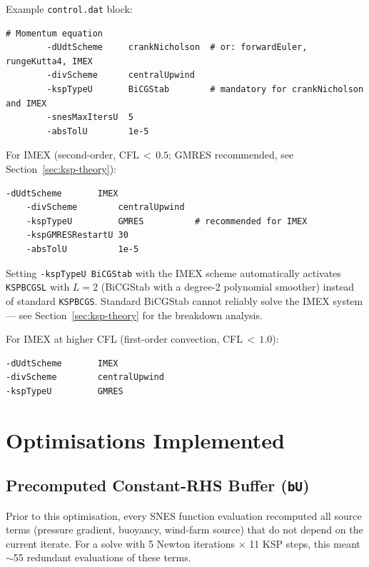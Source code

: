 \documentclass[12pt,a4paper]{article}
\begin{document}
	Example \texttt{control.dat} block:
	
	\begin{lstlisting}[language={},style=cstyle]
		# Momentum equation
		-dUdtScheme     crankNicholson  # or: forwardEuler, rungeKutta4, IMEX
		-divScheme      centralUpwind
		-kspTypeU       BiCGStab        # mandatory for crankNicholson and IMEX
		-snesMaxItersU  5
		-absTolU        1e-5
	\end{lstlisting}
	
	For IMEX (second-order, CFL$\,{<}\,0.5$; GMRES recommended,
	see Section~\ref{sec:ksp-theory}):
	\begin{lstlisting}[language={},style=cstyle]
	-dUdtScheme       IMEX
	-divScheme        centralUpwind
	-kspTypeU         GMRES          # recommended for IMEX
	-kspGMRESRestartU 30
	-absTolU          1e-5
	\end{lstlisting}

	\begin{notebox}
		Setting \texttt{-kspTypeU BiCGStab} with the IMEX scheme automatically
		activates \texttt{KSPBCGSL} with $L=2$ (BiCGStab with a degree-2
		polynomial smoother) instead of standard \texttt{KSPBCGS}.
		Standard BiCGStab cannot reliably solve the IMEX system ---
		see Section~\ref{sec:ksp-theory} for the breakdown analysis.
	\end{notebox}

	For IMEX at higher CFL (first-order convection, CFL$\,{<}\,1.0$):
	\begin{lstlisting}[language={},style=cstyle]
-dUdtScheme       IMEX
-divScheme        centralUpwind
-kspTypeU         GMRES
	\end{lstlisting}
	
	\section{Optimisations Implemented}
	
	\subsection{Precomputed Constant-RHS Buffer (\texttt{bU})}
	
	Prior to this optimisation, every SNES function evaluation recomputed
	all source terms (pressure gradient, buoyancy, wind-farm source) that
	do not depend on the current iterate. For a solve with 5 Newton
	iterations $\times$ 11 KSP steps, this meant $\sim$55 redundant
	evaluations of these terms.
	
\end{document}
